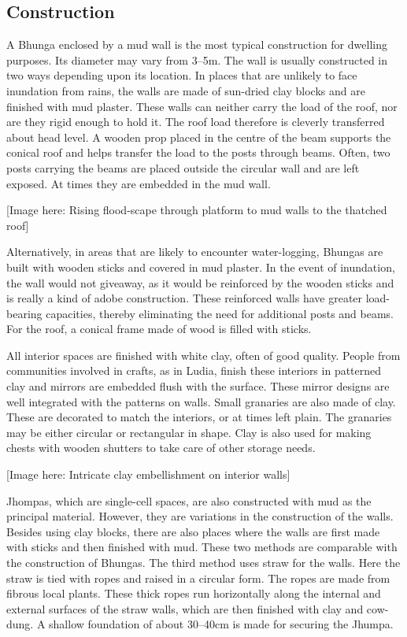 
\subsection{Construction} %
\label{sub:bvk_const}

A Bhunga enclosed by a mud wall is the most typical construction for dwelling purposes. Its diameter may vary from 3--5m. The wall is usually constructed in two ways depending upon its location. In places that are unlikely to face inundation from rains, the walls are made of sun-dried clay blocks and are finished with mud plaster. These walls can neither carry the load of the roof, nor are they rigid enough to hold it. The roof load therefore is cleverly transferred about head level. A wooden prop placed in the centre of the beam supports the conical roof and helps transfer the load to the posts through beams. Often, two posts carrying the beams are placed outside the circular wall and are left exposed. At times they are embedded in the mud wall.

[Image here: Rising flood-scape through platform to mud walls to the thatched roof]

Alternatively, in areas that are likely to encounter water-logging, Bhungas are built with wooden sticks and covered in mud plaster. In the event of inundation, the wall would not giveaway, as it would be reinforced by the wooden sticks and is really a kind of adobe construction. These reinforced walls have greater load-bearing capacities, thereby eliminating the need for additional posts and beams. For the roof, a conical frame made of wood is filled with sticks.

All interior spaces are finished with white clay, often of good quality. People from communities involved in crafts, as in Ludia, finish these interiors in patterned clay and mirrors are embedded flush with the surface. These mirror designs are well integrated with the patterns on walls. Small granaries are also made of clay. These are decorated to match the interiors, or at times left plain. The granaries may be either circular or rectangular in shape. Clay is also used for making chests with wooden shutters to take care of other storage needs.

[Image here: Intricate clay embellishment on interior walls]

Jhompas, which are single-cell spaces, are also constructed with mud as the principal material. However, they are variations in the construction of the walls. Besides using clay blocks, there are also places where the walls are first made with sticks and then finished with mud. These two methods are comparable with the construction of Bhungas. The third method uses straw for the walls. Here the straw is tied with ropes and raised in a circular form. The ropes are made from fibrous local plants. These thick ropes run horizontally along the internal and external surfaces of the straw walls, which are then finished with clay and cow-dung. A shallow foundation of about 30--40cm is made for securing the Jhumpa.

